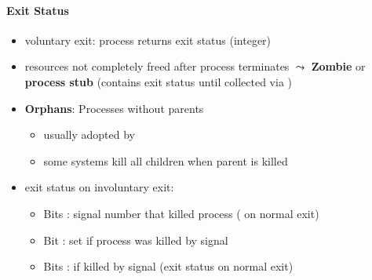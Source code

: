 \paragraph{Exit Status}
\begin{itemize}
  \item voluntary exit: process returns exit status (integer)
  \item resources not completely freed after process terminates
    \( \leadsto \) \textbf{Zombie} or \textbf{process stub} (contains exit status until collected via )
  \item \textbf{Orphans}: Processes without parents
  \begin{itemize}
    \item usually adopted by 
    \item some systems kill all children when parent is killed
  \end{itemize}
  \item exit status on involuntary exit:
  \begin{itemize}
    \item Bits : signal number that killed process ( on normal exit)
    \item Bit : set if process was killed by signal
    \item Bits :  if killed by signal (exit status on normal exit)
  \end{itemize}
\end{itemize}
